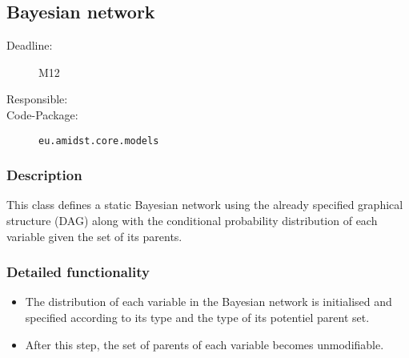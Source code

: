 \subsection{Bayesian network}
\label{BNs:ID}

\begin{description}
\item[Deadline:] M12
\item[Responsible:] 
\item[Code-Package:] \texttt{eu.amidst.core.models}
\end{description}

\subsubsection*{Description}

This class defines a static Bayesian network using the already specified graphical structure (DAG) along with the conditional probability distribution of each variable given the set of its parents.  

\subsubsection*{Detailed functionality}

\begin{itemize}

\item The distribution of each variable in the Bayesian network is initialised and specified according to its type and the type of its potentiel parent set. 

\item After this step, the set of parents of each variable becomes unmodifiable.

\end{itemize}